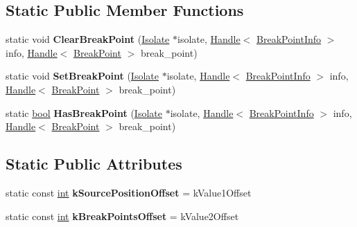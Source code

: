 \subsection*{Static Public Member Functions}
\begin{DoxyCompactItemize}
\item 
\mbox{\label{classv8_1_1internal_1_1BreakPointInfo_a77660fb7b21cb71f69fbf2e18630b91c}} 
static void {\bfseries Clear\+Break\+Point} (\mbox{\hyperlink{classv8_1_1internal_1_1Isolate}{Isolate}} $\ast$isolate, \mbox{\hyperlink{classv8_1_1internal_1_1Handle}{Handle}}$<$ \mbox{\hyperlink{classv8_1_1internal_1_1BreakPointInfo}{Break\+Point\+Info}} $>$ info, \mbox{\hyperlink{classv8_1_1internal_1_1Handle}{Handle}}$<$ \mbox{\hyperlink{classv8_1_1internal_1_1BreakPoint}{Break\+Point}} $>$ break\+\_\+point)
\item 
\mbox{\label{classv8_1_1internal_1_1BreakPointInfo_aee42a7c8187b800b0d87abede57b751f}} 
static void {\bfseries Set\+Break\+Point} (\mbox{\hyperlink{classv8_1_1internal_1_1Isolate}{Isolate}} $\ast$isolate, \mbox{\hyperlink{classv8_1_1internal_1_1Handle}{Handle}}$<$ \mbox{\hyperlink{classv8_1_1internal_1_1BreakPointInfo}{Break\+Point\+Info}} $>$ info, \mbox{\hyperlink{classv8_1_1internal_1_1Handle}{Handle}}$<$ \mbox{\hyperlink{classv8_1_1internal_1_1BreakPoint}{Break\+Point}} $>$ break\+\_\+point)
\item 
\mbox{\label{classv8_1_1internal_1_1BreakPointInfo_a656e1f1e9ff908ea5c205b029655ce81}} 
static \mbox{\hyperlink{classbool}{bool}} {\bfseries Has\+Break\+Point} (\mbox{\hyperlink{classv8_1_1internal_1_1Isolate}{Isolate}} $\ast$isolate, \mbox{\hyperlink{classv8_1_1internal_1_1Handle}{Handle}}$<$ \mbox{\hyperlink{classv8_1_1internal_1_1BreakPointInfo}{Break\+Point\+Info}} $>$ info, \mbox{\hyperlink{classv8_1_1internal_1_1Handle}{Handle}}$<$ \mbox{\hyperlink{classv8_1_1internal_1_1BreakPoint}{Break\+Point}} $>$ break\+\_\+point)
\end{DoxyCompactItemize}
\subsection*{Static Public Attributes}
\begin{DoxyCompactItemize}
\item 
\mbox{\label{classv8_1_1internal_1_1BreakPointInfo_abeca92485c4bc15ae6a053c330c7b736}} 
static const \mbox{\hyperlink{classint}{int}} {\bfseries k\+Source\+Position\+Offset} = k\+Value1\+Offset
\item 
\mbox{\label{classv8_1_1internal_1_1BreakPointInfo_a8a25ad7ca33286d58c4a79a42b98c9c5}} 
static const \mbox{\hyperlink{classint}{int}} {\bfseries k\+Break\+Points\+Offset} = k\+Value2\+Offset
\end{DoxyCompactItemize}

